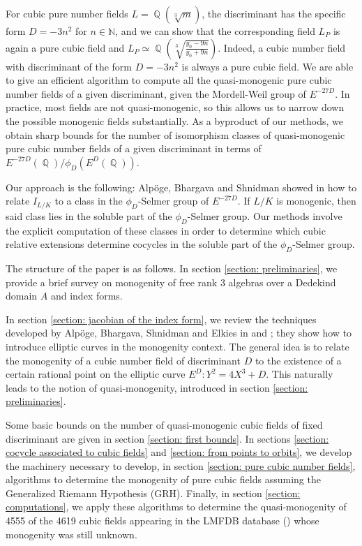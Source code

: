 \documentclass[oneside]{amsart}
\newcommand{\NN}{\mathbb{N}}
\newcommand{\embrace}[3]{\left#1 #3 \right#2}
\newcommand{\lpar}[1]{\embrace{(}{)}{#1}}
\DeclareMathOperator{\QQ}{\mathbb{Q}}
\theoremstyle{definition}
\begin{document}
For cubic pure number fields $L=\QQ(\sqrt[3]{m})$,  the discriminant has the specific form $D=-3n^2$ for $n\in\NN$, and we can show that the corresponding field $L_P$ is again a pure cubic field and $L_P\simeq\QQ\lpar{\sqrt[3]{\frac{y_0 - 9n}{y_0 + 9n}}}$.  Indeed, a cubic number field with discriminant of  the form $D=-3n^2$ is always a pure cubic field. We are able to give an efficient algorithm to compute all the quasi-monogenic pure cubic number fields of a given discriminant, given the Mordell-Weil group of $E^{-27D}$. In practice, most fields are not quasi-monogenic, so this allows us to narrow down the possible monogenic fields substantially. As a byproduct of our methods, we obtain sharp bounds for the number of isomorphism classes of quasi-monogenic pure cubic number fields of a given discriminant in terms of $E^{-27D}(\QQ)/\phi_D(E^D(\QQ))$.

Our approach is the following: Alpöge, Bhargava and Shnidman showed in \cite{Bhargava} how to relate $I_{L/K}$ to a class in the $\phi_D$-Selmer group of $E^{-27D}$. If $L/K$ is monogenic, then said class lies in the soluble part of the $\phi_D$-Selmer group. Our methods involve the explicit computation of these classes in order to determine which cubic relative extensions determine cocycles in the soluble part of the $\phi_D$-Selmer group. 

The structure  of the paper is as  follows. In section \ref{section: preliminaries}, we provide a brief survey on monogenity of free rank 3 algebras over a Dedekind domain $A$ and index forms. 

In section \ref{section: jacobian of the index form}, we review the techniques developed by Alpöge, Bhargava, Shnidman and Elkies in \cite{Bhargava} and \cite{Bhargava_2019}; they  show how to introduce  elliptic curves in the monogenity context. The general idea is to relate the monogenity of a cubic number field of discriminant $D$ to the existence of a certain rational point on the elliptic curve $E^{D}:Y^2 = 4X^3 + D$. This  naturally leads to the notion of quasi-monogenity, introduced in section \ref{section: preliminaries}. 

Some basic bounds on the number of quasi-monogenic cubic  fields of fixed discriminant are given  in section \ref{section: first bounds}. In sections \ref{section: cocycle associated to cubic fields} and \ref{section: from points to orbits}, we develop the machinery necessary to develop, in section    \ref{section: pure cubic number fields},  algorithms to determine the monogenity of pure cubic fields assuming the Generalized Riemann Hypothesis (GRH). Finally, in section \ref{section: computations}, we apply these algorithms to determine the quasi-monogenity of 4555 of the 4619 cubic fields appearing in the LMFDB database (\cite{lmfdb}) whose monogenity was still unknown.
\end{document}
